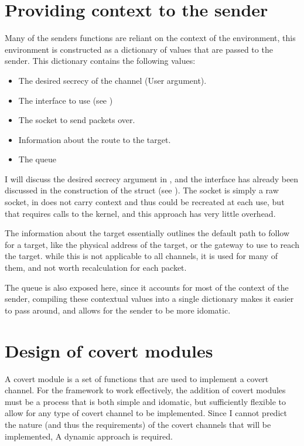 \section{Providing context to the sender}
\label{sec:context}

Many of the senders functions are reliant on the context of the environment, this environment is constructed as a dictionary of values that are passed to the sender. This dictionary contains the following values:

\begin{itemize}
    \item The desired secrecy of the channel (User argument).
    \item The interface to use (see )
    \item The socket to send packets over.
    \item Information about the route to the target.
    \item The queue
\end{itemize}

I will discuss the desired secrecy argument in , and the interface has already been discussed in the construction of the  struct (see ). The socket is simply a raw socket, in does not carry context and thus could be recreated at each use, but that requires calls to the kernel, and this approach has very little overhead.

The information about the target essentially outlines the default path to follow for a target, like the physical address of the target, or the gateway to use to reach the target. while this is not applicable to all channels, it is used for many of them, and not worth recalculation for each packet.

The queue is also exposed here, since it accounts for most of the context of the sender, compiling these contextual values into a single dictionary makes it easier to pass around, and allows for the sender to be more idomatic.

\section{Design of covert modules}
\label{sec:covert_modules}

A covert module is a set of functions that are used to implement a covert channel. For the framework to work effectively, the addition of covert modules must be a process that is both simple and idomatic, but sufficiently flexible to allow for any type of covert channel to be implemented. Since I cannot predict the nature (and thus the requirements) of the covert channels that will be implemented, A dynamic approach is required.

